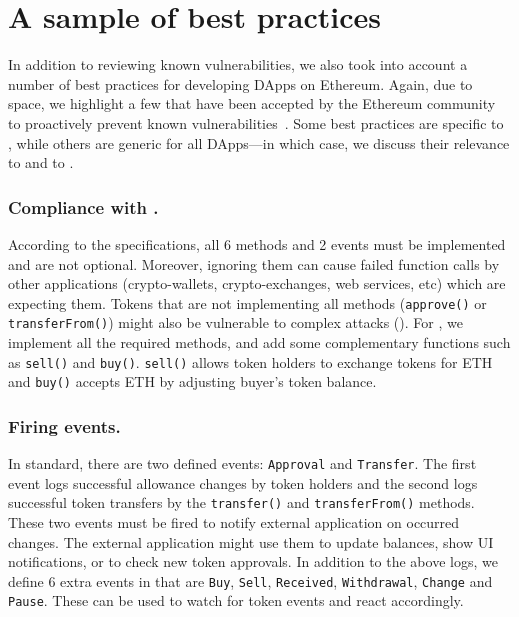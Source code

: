 
\section{A sample of best practices}\label{section:bp}

In addition to reviewing known vulnerabilities, we also took into account a number of best practices for developing DApps on Ethereum. Again, due to space, we highlight a few that have been accepted by the Ethereum community to proactively prevent known vulnerabilities~\cite{TokenBP}. Some best practices are specific to \erc, while others are generic for all DApps---in which case, we discuss their relevance to \erc and to \sys.

\subsubsection{Compliance with \erc.}

According to the \erc specifications, all 6 methods and 2 events must be implemented and are not optional. Moreover, ignoring them can cause failed function calls by other applications (\ie crypto-wallets, crypto-exchanges, web services, etc) which are expecting them. Tokens that are not implementing all methods (\eg \texttt{approve()} or \texttt{transferFrom()}) might also be vulnerable to complex attacks (\cf  \cite{DEPOSafe}). For \sys, we implement all the required methods, and add some complementary functions such as \texttt{sell()} and \texttt{buy()}. \texttt{sell()} allows token holders to exchange tokens for ETH and \texttt{buy()} accepts ETH by adjusting buyer's token balance.

\subsubsection{Firing events.}

In \erc standard, there are two defined events: \texttt{Approval} and \texttt{Transfer}. The first event logs successful allowance changes by token holders and the second logs successful token transfers by the \texttt{transfer()} and \texttt{transferFrom()} methods. These two events must be fired to notify external application on occurred changes. The external application might use them to update balances, show UI notifications, or to check new token approvals. In addition to the above logs, we define 6 extra events in \sys that are \texttt{Buy}, \texttt{Sell}, \texttt{Received}, \texttt{Withdrawal}, \texttt{Change} and \texttt{Pause}. These can be used to watch for token events and react accordingly.

